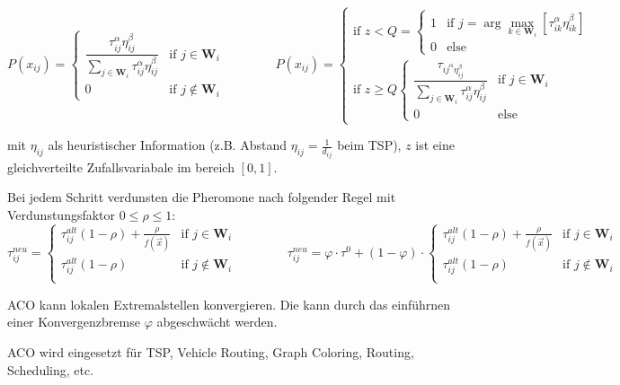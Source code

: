  $$P(x_{ij}) = \begin{cases} \dfrac{\tau_{ij}^\alpha \eta_{ij}^\beta}{\sum\limits_{j \in \mathbf{W}_i} \tau_{ij}^\alpha \eta_{ij}^\beta}  & \text{if }j \in \mathbf{W}_i\\ 0 & \text{if }j \notin \mathbf{W}_i \end{cases}
  \qquad \qquad
  P(x_{ij}) = 
  \begin{cases}
    \text{if } z < Q = 
    \begin{cases}
      1 & \text{if } j = \arg \max\limits_{k \in \mathbf{W}_i}[\tau_{ik}^\alpha \eta_{ik}^\beta] \\
      0 & \text{else}
    \end{cases} \\
    \text{if } z \geq Q
    \begin{cases}
      \dfrac{\tau_{ij^\alpha \eta_{ij}^\beta}}{\sum\limits_{j \in \mathbf{W}_i} \tau_{ij}^\alpha \eta_{ij}^\beta}  & \text{if }j \in \mathbf{W}_i\\
      0 & \text{else}
    \end{cases}
  \end{cases}$$
  
  mit $\eta_{ij}$ als heuristischer Information (z.B. Abstand $\eta_{ij} = \frac{1}{d_{ij}}$ beim TSP), $z$ ist eine gleichverteilte Zufallsvariabale im bereich $[0,1]$.
  
  Bei jedem Schritt verdunsten die Pheromone nach folgender Regel mit Verdunstungsfaktor $0 \leq \rho \leq 1$:
  $$\tau_{ij}^{neu} = \begin{cases}
    \tau_{ij}^{alt} (1-\rho) + \frac{\rho}{f(\vec{x})} & \text{if } j \in \mathbf{W}_i\\
    \tau_{ij}^{alt} (1-\rho) & \text{if } j \notin \mathbf{W}_i\\
  \end{cases}
  \qquad \qquad
  \tau_{ij}^{neu} = \varphi \cdot \tau^0 + (1-\varphi) \cdot
  \begin{cases}
      \tau_{ij}^{alt} (1-\rho) + \frac{\rho}{f(\vec{x})} & \text{if } j \in \mathbf{W}_i\\
      \tau_{ij}^{alt} (1-\rho) & \text{if } j \notin \mathbf{W}_i\\
    \end{cases}
  $$
  
  ACO kann lokalen Extremalstellen konvergieren. Die kann durch das einführnen einer Konvergenzbremse $\varphi$ abgeschwächt werden.
  
  ACO wird eingesetzt für TSP, Vehicle Routing, Graph Coloring, Routing, Scheduling, etc.
  
